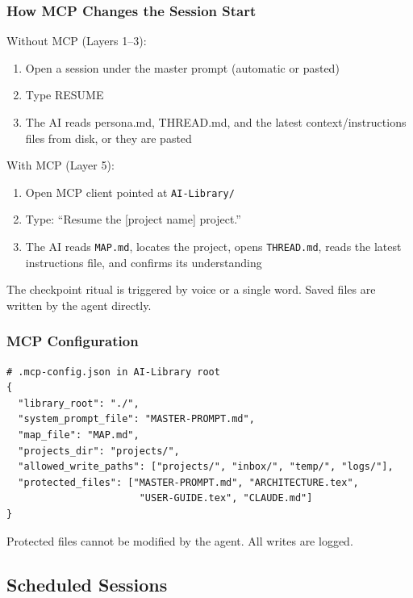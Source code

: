 \documentclass[12pt,letterpaper]{article}
\begin{document}
\subsubsection{How MCP Changes the Session Start}

Without MCP (Layers 1--3):

\begin{enumerate}
  \item Open a session under the master prompt (automatic or pasted)
  \item Type RESUME
  \item The AI reads persona.md, THREAD.md, and the latest
        context/instructions files from disk, or they are pasted
\end{enumerate}

With MCP (Layer 5):

\begin{enumerate}
  \item Open MCP client pointed at \texttt{AI-Library/}
  \item Type: ``Resume the [project name] project.''
  \item The AI reads \texttt{MAP.md}, locates the project, opens
        \texttt{THREAD.md}, reads the latest instructions file,
        and confirms its understanding
\end{enumerate}

The checkpoint ritual is triggered by voice or a single word. Saved
files are written by the agent directly.

\subsubsection{MCP Configuration}

\begin{lstlisting}
# .mcp-config.json in AI-Library root
{
  "library_root": "./",
  "system_prompt_file": "MASTER-PROMPT.md",
  "map_file": "MAP.md",
  "projects_dir": "projects/",
  "allowed_write_paths": ["projects/", "inbox/", "temp/", "logs/"],
  "protected_files": ["MASTER-PROMPT.md", "ARCHITECTURE.tex",
                       "USER-GUIDE.tex", "CLAUDE.md"]
}
\end{lstlisting}

Protected files cannot be modified by the agent. All writes are logged.

\subsection{Scheduled Sessions}
\end{document}
